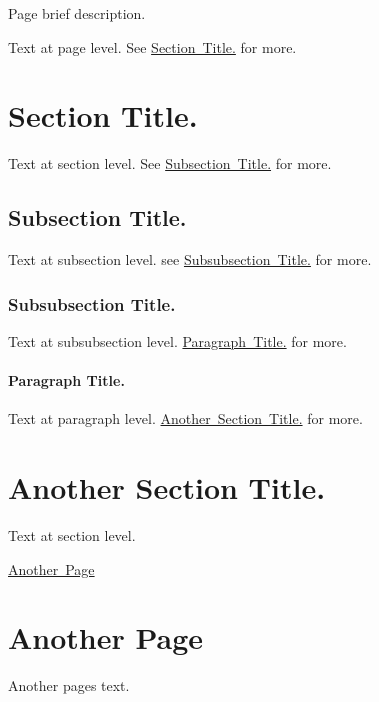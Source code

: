 \localtableofcontents
Page brief description.

Text at page level. See \mbox{\hyperlink{mypage_mysect}{Section Title.}} for more. \hypertarget{mypage_mysect}{}\section{Section Title.}\label{mypage_mysect}
Text at section level. See \mbox{\hyperlink{mypage_mysubsect}{Subsection Title.}} for more. \hypertarget{mypage_mysubsect}{}\subsection{Subsection Title.}\label{mypage_mysubsect}
Text at subsection level. see \mbox{\hyperlink{mypage_mysubsubsect}{Subsubsection Title.}} for more. \hypertarget{mypage_mysubsubsect}{}\subsubsection{Subsubsection Title.}\label{mypage_mysubsubsect}
Text at subsubsection level. \mbox{\hyperlink{mypage_mypara}{Paragraph Title.}} for more. \hypertarget{mypage_mypara}{}\paragraph{Paragraph Title.}\label{mypage_mypara}
Text at paragraph level. \mbox{\hyperlink{mypage_mysect2}{Another Section Title.}} for more. \hypertarget{mypage_mysect2}{}\section{Another Section Title.}\label{mypage_mysect2}
Text at section level.

\mbox{\hyperlink{another}{Another Page}} \hypertarget{another}{}\section{Another Page}\label{another}
Another page\textquotesingle{}s text. 